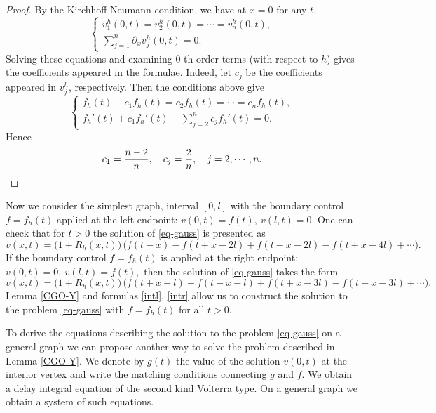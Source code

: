\documentclass[11pt]{amsart}
\theoremstyle{definition}
\theoremstyle{plain}
\numberwithin{equation}{section}
\begin{document}
\begin{proof}
By the Kirchhoff-Neumann condition, we have at $x=0$ for any $t$,
\begin{equation*}
    \begin{cases}
v_1^h(0,t)=v_2^h(0,t)=\cdots=v_n^h(0,t), \\
\sum_{j=1}^n \partial_x v_j^h(0,t)=0.
\end{cases}
\end{equation*}
Solving these equations and examining $0$-th order terms (with respect to $h$) gives the coefficients appeared in the formulae. Indeed, let $c_j$ be the coefficients appeared in $v_j^h$, respectively. Then the conditions above give
\begin{equation*}
    \begin{cases}
f_h(t)-c_1 f_h(t)=c_2 f_h(t)=\cdots=c_n f_h(t), \\
f_h'(t)+c_1 f_h'(t)-\sum_{j=2}^n c_j f_h'(t)=0.
\end{cases}
\end{equation*}
Hence 
\begin{equation*}
c_1=\frac{n-2}{n}, \quad c_j=\frac2n,\quad j=2,\cdots,n. \qedhere
\end{equation*}
\end{proof}

Now we consider the simplest graph, interval $[0,l]$ with the boundary control $f=f_h(t)$ applied at the left endpoint: $v(0,t)=f(t), \ v(l,t)=0.$ One can check that
for $t>0$ the solution of \eqref{eq-gauss} is presented as
\begin{equation} \label{intl}
v(x,t)= \Big(1+R_h(x,t) \Big)\,\Big( f(t-x)-f(t+x-2l)+f(t-x-2l)-f(t+x-4l)+\cdots \Big).
\end{equation}
If the boundary control $f=f_h(t)$ is applied at the right endpoint: $v(0,t)=0, \ v(l,t)=f(t),$ then the solution of \eqref{eq-gauss} takes the form
\begin{equation} \label{intr}
v(x,t)=\Big(1+ R_h(x,t) \Big)\,\Big(f(t+x-l)-f(t-x-l)+f(t+x-3l)-f(t-x-3l)+\cdots \Big).
\end{equation}
Lemma \ref{CGO-Y} and formulas \eqref{intl}, \eqref{intr} allow us to construct the solution to the problem \eqref{eq-gauss} with $f=f_h(t)$ for all $t>0.$

To derive the equations describing the solution to the problem \eqref{eq-gauss} on a general graph we can propose another way to solve the problem described in Lemma \ref{CGO-Y}. We denote  by $g(t)$  the value of the solution $v(0,t)$ at the interior vertex and write the matching conditions connecting $g$ and $f$.
We obtain a delay integral equation of the second kind Volterra type. On a general graph we obtain a system of such equations.
\end{document}
